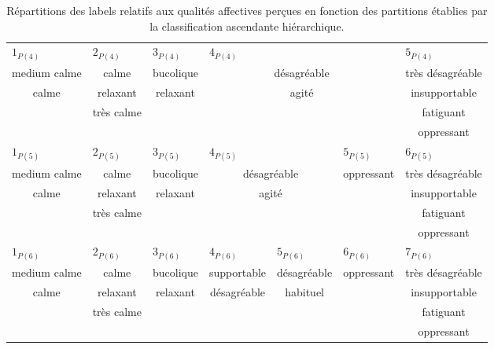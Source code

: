 \begin{table}[t]
\begin{tabular}{c|c|c|c|c|c|c}
\hline
\multicolumn{1}{l|}{$1_{P(4)}$} & \multicolumn{1}{l|}{$2_{P(4)}$} & \multicolumn{1}{l|}{$3_{P(4)}$}  & \multicolumn{3}{l|}{$4_{P(4)}$} & \multicolumn{1}{l}{$5_{P(4)}$} \\
medium calme         & calme       & bucolique  & \multicolumn{3}{c|}{désagréable} & très désagréable\\
calme                & relaxant   & relaxant & \multicolumn{3}{c|}{agité}   & insupportable\\
                     & très calme  &          & \multicolumn{3}{c|}{}           & fatiguant\\
                     &            &          & \multicolumn{3}{c|}{}           & oppressant\\                                      
\hline
\multicolumn{1}{l|}{$1_{P(5)}$} & \multicolumn{1}{l|}{$2_{P(5)}$} & \multicolumn{1}{l|}{$3_{P(5)}$}  & \multicolumn{2}{l|}{$4_{P(5)}$} & \multicolumn{1}{l|}{$5_{P(5)}$} & \multicolumn{1}{l}{$6_{P(5)}$}\\ 
medium calme          & calme      & bucolique  & \multicolumn{2}{c|}{désagréable} & oppressant & très désagréable\\     
calme                 & relaxant   & relaxant   & \multicolumn{2}{c|}{agité}       &            & insupportable\\  
                      & très calme &            & \multicolumn{2}{c|}{}            &            & fatiguant \\  
                      &            &            & \multicolumn{2}{c|}{}            &            & oppressant \\               
\hline
\multicolumn{1}{l|}{$1_{P(6)}$} & \multicolumn{1}{l|}{$2_{P(6)}$} & \multicolumn{1}{l|}{$3_{P(6)}$}  & \multicolumn{1}{l|}{$4_{P(6)}$} & \multicolumn{1}{l|}{$5_{P(6)}$} & \multicolumn{1}{l|}{$6_{P(6)}$} & \multicolumn{1}{l}{$7_{P(6)}$} \\  
medium calme          & calme      & bucolique  & supportable    & désagréable  & oppressant & très désagréable \\        
calme                 & relaxant   & relaxant  & désagréable     & habituel     &            & insupportable \\  
                      & très calme &           &                 &              &            & fatiguant\\  
                      &            &           &                 &              &            & oppressant \\  
\hline
\end{tabular} 
\vspace{0.5mm}
\caption{Répartitions des labels relatifs aux qualités affectives perçues en fonction des partitions établies par la classification ascendante hiérarchique.}
\label{tab:markerHacQualite}
\end{table}

